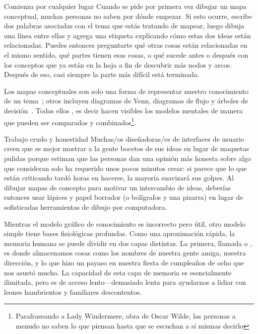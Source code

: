 \begin{aside}{Comienza por cualquier lugar}
  Cuando se pide por primera vez dibujar un mapa conceptual, muchas personas no saben por dónde empezar.
  Si esto ocurre,
  escribe dos palabras asociadas con el tema que estás tratando de mapear,
 luego dibuja una línea entre ellas y agrega una etiqueta explicando cómo estas dos ideas están relacionadas.
  Puedes entonces preguntarte qué otras cosas están relacionadas en el mismo sentido,
  qué partes tienen esas cosas,
  o qué sucede antes o después con los conceptos que ya están en la hoja
  a fin de descubrir más nodos y arcos.
  Después de eso, casi siempre la parte más difícil está terminada.
\end{aside}

Los mapas conceptuales son solo una forma de representar nuestro conocimiento de un tema~\cite{Eppl2006};
otros incluyen diagramas de Venn, diagramas de flujo y árboles de decisión~\cite{Abel2009}.
Todos ellos ,
es decir hacen visibles los modelos mentales de manera que pueden ser comparados y combinados\footnote{Parafraseando a
 Lady Windermere, obra de Oscar Wilde,
las personas a menudo no saben lo que piensan hasta que se escuchan a sí mismas decirlo}.

\begin{aside}{Trabajo crudo y honestidad}
  Muchas/os diseñadoras/es de interfaces de usuario creen que es mejor mostrar a la gente bocetos de sus ideas en lugar de maquetas pulidas
  porque estiman que las personas dan una opinión más honesta sobre algo que 
  consideran solo ha requerido unos pocos minutos crear:
  si parece que lo que están criticando tardó horas en hacerse, 
  la mayoría suavizará sus golpes.
  Al dibujar mapas de concepto para motivar un intercambio de ideas,
  deberías entonces usar lápices y papel borrador (o bolígrafos y una pizarra)
  en lugar de sofisticadas herramientas de dibujo por computadora.
\end{aside}


Mientras el modelo gráfico de conocimiento es incorrecto pero útil,
otro modelo simple tiene bases fisiológicas profundas.
Como una aproximación rápida,
la memoria humana se puede dividir en dos capas distintas.
La primera,
llamada 
o ,
es donde almacenamos cosas como los nombres de nuestra gente amiga,
nuestra dirección,
y lo que hizo un payaso en nuestra fiesta de cumpleaños de ocho que nos asustó mucho.
La capacidad de esta capa de memoria es esencialmente ilimitada,
pero es de acceso lento---demasiado lenta para ayudarnos a lidiar con leones hambrientos  y familiares descontentos.


